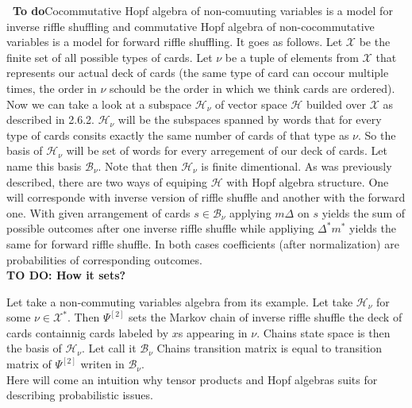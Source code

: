 \documentclass[a4paper, 12pt]{report}
\newcommand{\todo}[1]{\hfill \break \textbf{\Huge TO DO: #1 \hfill \break}\normalsize}
\newcommand{\smalltodo}[1]{\textbf{\ To do}}
\begin{document}
\smalltodo\
Cocommutative Hopf algebra of non-comuuting variables is a model for inverse riffle shuffling and commutative
Hopf algebra of non-cocommutative variables is a model for forward riffle shuffling. It goes as follows.
Let $\mathcal{X}$ be the finite set of all possible types of cards. Let $\nu$ be a tuple of
elements from $\mathcal{X}$ that represents our actual deck of cards (the same type of card can occour
multiple times, the order in $\nu$ schould be the order in which we think cards are ordered). Now we can
take a look at a subspace $\mathcal{H}_\nu$ of vector space $\mathcal{H}$ builded over $\mathcal{X}$ as
described in 2.6.2. $\mathcal{H}_\nu$ will be the subspaces spanned by words that for every type of cards
consits exactly the same number of cards of that type as $\nu$. So the basis of $\mathcal{H}_\nu$ will be set
of words for every arregement of our deck of cards. Let name this basis $\mathcal{B}_\nu$. Note that then
$\mathcal{H}_\nu$ is finite dimentional. As was previously described, there are two ways of equiping
$\mathcal{H}$ with Hopf algebra structure. One will corresponde with inverse version of riffle shuffle and
another with the forward one. With given arrangement of cards $s \in \mathcal{B}_\nu$ applying $m\Delta$ on
$s$ yields the sum of possible outcomes after one inverse riffle shuffle while appliying $\Delta^*m^*$
yields the same for forward riffle shuffle. In both cases coefficients (after normalization) are
probabilities of corresponding outcomes. \\[4pt]

\todo{How it sets?}

Let take a non-commuting variables algebra from its example. Let take $\mathcal{H}_\nu$ for some
$\nu \in \mathcal{X}^*$. Then $\Psi^{[2]}$ sets the Markov chain of inverse riffle shuffle the deck of cards
containnig cards labeled by $x$s appearing in $\nu$. Chains state space is then the basis of
$\mathcal{H}_\nu$. Let call it $\mathcal{B}_\nu$
Chains transition matrix is equal to transition matrix of $\Psi^{[2]}$ writen in $\mathcal{B}_\nu$.  \\

Here will come an intuition why tensor products and Hopf algebras suits for describing probabilistic issues.
\end{document}
